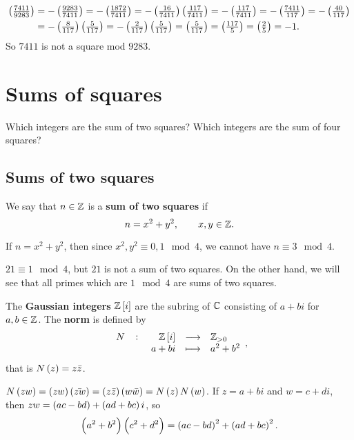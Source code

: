 \begin{example*}
\begin{align*}
\jacobi{7411}{9283}
& = -\jacobi{9283}{7411} = -\jacobi{1872}{7411} = -\jacobi{16}{7411}\jacobi{117}{7411} = -\jacobi{117}{7411} = -\jacobi{7411}{117} = -\jacobi{40}{117} \\
& = -\jacobi{8}{117}\jacobi{5}{117} = -\jacobi{2}{117}\jacobi{5}{117} = \jacobi{5}{117} = \jacobi{117}{5} = \jacobi{2}{5} = -1.
\end{align*}
So $ 7411 $ is not a square mod $ 9283 $.
\end{example*}

\pagebreak

\section{Sums of squares}

Which integers are the sum of two squares? Which integers are the sum of four squares?

\subsection{Sums of two squares}

\begin{definition}
We say that $ n \in \mathbb{Z} $ is a \textbf{sum of two squares} if
$$ n = x^2 + y^2, \qquad x, y \in \mathbb{Z}. $$
\end{definition}

\begin{example*}
If $ n = x^2 + y^2 $, then since $ x^2, y^2 \equiv 0, 1 \mod 4 $, we cannot have $ n \equiv 3 \mod 4 $.
\end{example*}

\begin{example*}
$ 21 \equiv 1 \mod 4 $, but $ 21 $ is not a sum of two squares. On the other hand, we will see that all primes which are $ 1 \mod 4 $ are sums of two squares.
\end{example*}

\begin{definition}
The \textbf{Gaussian integers} $ \Z\sbr{i} $ are the subring of $ \mathbb{C} $ consisting of $ a + bi $ for $ a, b \in \mathbb{Z} $. The \textbf{norm} is defined by
$$ \function[N]{\Z\sbr{i}}{\Z_{> 0}}{a + bi}{a^2 + b^2}, $$
that is $ N\br{z} = z\bar{z} $.
\end{definition}

$ N\br{zw} = \br{zw}\br{\bar{zw}} = \br{z\bar{z}}\br{w\bar{w}} = N\br{z}N\br{w} $. If $ z = a + bi $ and $ w = c + di $, then $ zw = \br{ac - bd} + \br{ad + bc}i $, so
$$ \br{a^2 + b^2}\br{c^2 + d^2} = \br{ac - bd}^2 + \br{ad + bc}^2. $$

